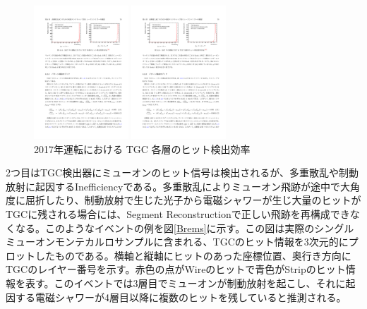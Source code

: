 \begin{figure}
\begin{minipage}[b]{.5\linewidth}
\centering
\includegraphics[height=5cm]{fig/Test/tgchit_wire.pdf}
\end{minipage}%
\begin{minipage}[b]{.5\linewidth}
\centering
\includegraphics[height=5cm]{fig/Test/tgchit_strip.pdf}
\end{minipage}%
\caption[2017年運転における TGC 各層のヒット検出効率]{2017年運転における TGC 各層のヒット検出効率\cite{mt_kawaguchi}}
\label{tgchit_efficiency}
\end{figure}

2つ目はTGC検出器にミューオンのヒット信号は検出されるが、多重散乱や制動放射に起因するInefficiencyである。多重散乱によりミューオン飛跡が途中で大角度に屈折したり、制動放射で生じた光子から電磁シャワーが生じ大量のヒットがTGCに残される場合には、Segment Reconstructionで正しい飛跡を再構成できなくなる。このようなイベントの例を図\ref{Brems}に示す。この図は実際のシングルミューオンモンテカルロサンプルに含まれる、TGCのヒット情報を3次元的にプロットしたものである。横軸と縦軸にヒットのあった座標位置、奥行き方向にTGCのレイヤー番号を示す。赤色の点がWireのヒットで青色がStripのヒット情報を表す。このイベントでは3層目でミューオンが制動放射を起こし、それに起因する電磁シャワーが4層目以降に複数のヒットを残していると推測される。

